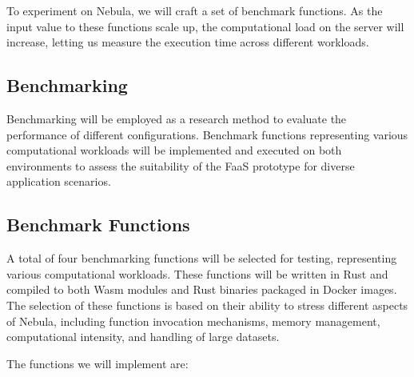\documentclass[
  table]{report}
\begin{document}
To experiment on Nebula, we will craft a set of benchmark functions. As
the input value to these functions scale up, the computational load on
the server will increase, letting us measure the execution time across
different workloads.

\subsection{Benchmarking}
\label{sect:benchmark}

Benchmarking will be employed as a research method to evaluate the
performance of different configurations. Benchmark functions
representing various computational workloads will be implemented and
executed on both environments to assess the suitability of the \ac{FaaS}
prototype for diverse application scenarios.

\subsection{Benchmark Functions}
\label{sect:bench_funct}

A total of four benchmarking functions will be selected for testing,
representing various computational workloads. These functions will be
written in Rust and compiled to both \ac{Wasm} modules and Rust binaries
packaged in Docker images. The selection of these functions is based on
their ability to stress different aspects of Nebula, including function
invocation mechanisms, memory management, computational intensity, and
handling of large datasets.

The functions we will implement are:
\end{document}
